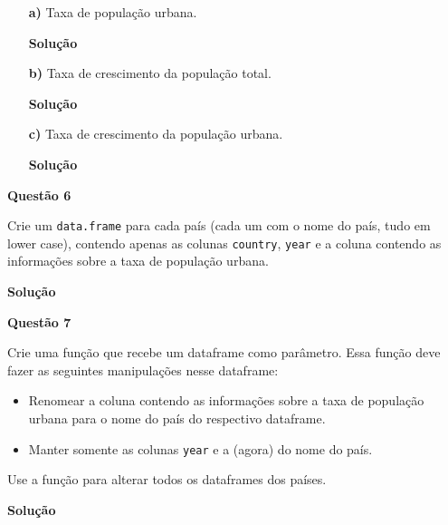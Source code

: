 \documentclass[12pt, a4paper]{article}
\begin{document}
\begin{itemize}
	\item[\textbf{a)}] Taxa de população urbana.
	
	
	\textbf{Solução}
	
	
	
	
	
	\item[\textbf{b)}] Taxa de crescimento da população total.
	
	
	\textbf{Solução}
	
	
	
	
	
	\item[\textbf{c)}] Taxa de crescimento da população urbana.
	
	
	\textbf{Solução}
	
	
	
	
	
\end{itemize}



\textbf{Questão 6}

Crie um \texttt{data.frame} para cada país (cada um com o nome do país, tudo em lower case), contendo apenas as colunas \texttt{country}, \texttt{year} e a coluna contendo as informações sobre a taxa de população urbana.



\textbf{Solução}





\textbf{Questão 7}

Crie uma função que recebe um dataframe como parâmetro. Essa função deve fazer as seguintes manipulações nesse dataframe:

\begin{itemize}
	\item Renomear a coluna contendo as informações sobre a taxa de população urbana para o nome do país do respectivo dataframe.
	\item Manter somente as colunas \texttt{year} e a (agora) do nome do país.
\end{itemize}

Use a função para alterar todos os dataframes dos países.



\textbf{Solução}
\end{document}
